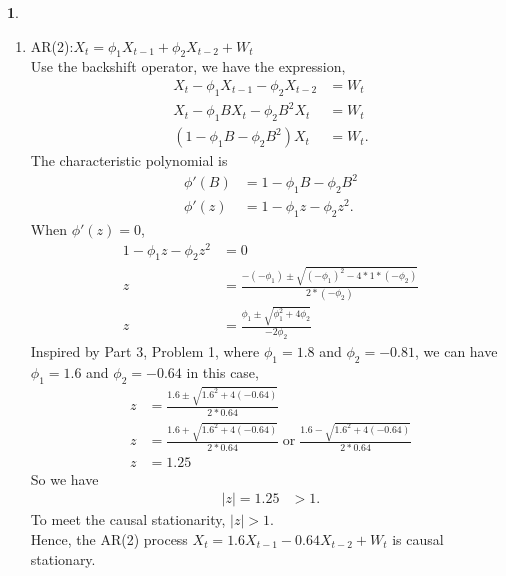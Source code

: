 \documentclass[10pt]{article}
\newtheorem{prob}{\bm{$Problem$}}
\begin{document}
\begin{prob}
\end{prob}
\begin{enumerate}[1)]
\vspace{3mm}

\item
AR(2):$X_t=\phi_1X_{t-1}+\phi_2X_{t-2}+W_t$\\
Use the backshift operator, we have the expression,
\begin{align*}
X_t-\phi_1X_{t-1}-\phi_2X_{t-2}&=W_t\\
X_t-\phi_1BX_t-\phi_2B^2X_t&=W_t\\
(1-\phi_1B-\phi_2B^2)X_t&=W_t.
\end{align*}
The characteristic polynomial is
\begin{align*}
\phi'(B)&=1-\phi_1B-\phi_2B^2\\
\phi'(z)&=1-\phi_1z-\phi_2z^2.
\end{align*}
When $\phi'(z)=0$,
\begin{align*}
1-\phi_1z-\phi_2z^2&=0\\
z&=\frac{-(-\phi_1)\pm\sqrt{(-\phi_1)^2-4*1*(-\phi_2)}}{2*(-\phi_2)}\\
z&=\frac{\phi_1\pm\sqrt{\phi_1^2+4\phi_2}}{-2\phi_2}
\end{align*}
Inspired by Part 3, Problem 1, where $\phi_1=1.8$ and $\phi_2=-0.81$, we can have $\phi_1=1.6$ and $\phi_2=-0.64$ in this case,
\begin{align*}
z&=\frac{1.6\pm\sqrt{1.6^2+4(-0.64)}}{2*0.64}\\
z&=\frac{1.6+\sqrt{1.6^2+4(-0.64)}}{2*0.64}\;\textrm{or}\;\frac{1.6-\sqrt{1.6^2+4(-0.64)}}{2*0.64}\\
z&=1.25
\end{align*}
So we have
\begin{align*}
|z|=1.25&>1.
\end{align*}
To meet the causal stationarity, $|z|>1$.\\
Hence, the AR(2) process $X_t=1.6X_{t-1}-0.64X_{t-2}+W_t$ is causal stationary.


\end{enumerate}
\end{document}
